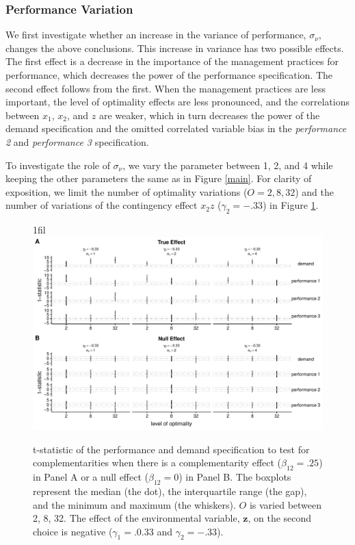 \documentclass[12pt]{article}
\makeatletter
\newcommand*{\centerfloat}{%
  \parindent \z@
  \leftskip \z@ \@plus 1fil \@minus \textwidth
  \rightskip\leftskip
  \parfillskip \z@skip}
\makeatother
\begin{document}
\subsubsection{Performance Variation}\label{performance-variation}

We first investigate whether an increase in the variance of performance, $\sigma_{\nu}$, changes the above conclusions. This increase in variance has two possible effects. The first effect is a decrease in the importance of the management practices for performance, which decreases the power of the performance specification. The second effect follows from the first. When the management practices are less important, the level of optimality effects are less pronounced, and the correlations between $x_1$, $x_2$, and $z$ are weaker, which in turn decreases the power of the demand specification and the omitted correlated variable bias in the \emph{performance 2} and \emph{performance 3} specification.

To investigate the role of $\sigma_{\nu}$, we vary the parameter between 1, 2, and 4 while keeping the other parameters the same as in Figure \ref{main}. For clarity of exposition, we limit the number of optimality variations ($O = 2, 8, 32$) and the number of variations of the contingency effect $x_2 z$ ($\gamma_2 = -.33$) in Figure \ref{noise}.

\begin{figure}
\centerfloat
\includegraphics[width=450px]{figure-latex/noise_new_plot.pdf}
\caption[Error Rate and Power with Increasing Levels of Variability in Performance]
{\label{noise} t-statistic of the performance and demand specification to test
for complementarities when there is a complementarity effect ($\beta_{12} = .25$)
in Panel A or a null effect ($\beta_{12} = 0$) in Panel B. The boxplots represent the median (the dot), the interquartile range (the gap), and the minimum and maximum (the whiskers). $O$ is varied between 2, 8, 32. The effect of the environmental variable, $\mathbf{z}$, on the second choice is negative ($\gamma_1 = .0.33$ and $\gamma_2 = -.33$).}
\end{figure}
\end{document}
